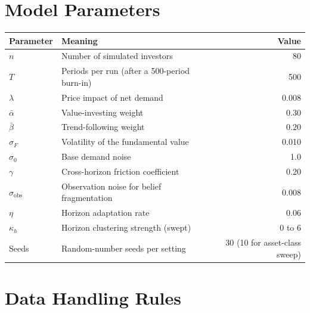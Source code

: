 \section{Model Parameters}
\label{app:params}

\begin{table}[htbp]
\centering
\begin{tabular}{llr}
\toprule
Parameter & Meaning & Value\\
\midrule
$n$ & Number of simulated investors & 80\\
$T$ & Periods per run (after a 500-period burn-in) & 500\\
$\lambda$ & Price impact of net demand & 0.008\\
$\bar\alpha$ & Value-investing weight & 0.30\\
$\bar\beta$ & Trend-following weight & 0.20\\
$\sigma_F$ & Volatility of the fundamental value & 0.010\\
$\sigma_0$ & Base demand noise & 1.0\\
$\gamma$ & Cross-horizon friction coefficient & 0.20\\
$\sigma_{\mathrm{obs}}$ & Observation noise for belief fragmentation & 0.008\\
$\eta$ & Horizon adaptation rate & 0.06\\
$\kappa_h$ & Horizon clustering strength (swept) & 0 to 6\\
Seeds & Random-number seeds per setting & 30 (10 for asset-class sweep)\\
\bottomrule
\end{tabular}
\end{table}

\section{Data Handling Rules}
\label{app:checks}

